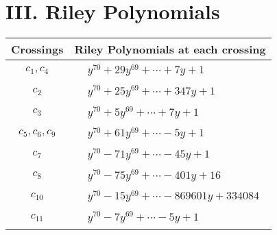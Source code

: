 \documentclass[1p]{elsarticle_modified}
\theoremstyle{definition}
\begin{document}
\centering \section*{ III. Riley Polynomials}
\begin{tabular}{m{50pt}|m{274pt}}
Crossings & \hspace{64pt}Riley Polynomials at each crossing \\
\hline $$\begin{aligned}c_{1},c_{4}\end{aligned}$$&$\begin{aligned}
&y^{70}+29 y^{69}+\cdots+7 y+1
\end{aligned}$\\
\hline $$\begin{aligned}c_{2}\end{aligned}$$&$\begin{aligned}
&y^{70}+25 y^{69}+\cdots+347 y+1
\end{aligned}$\\
\hline $$\begin{aligned}c_{3}\end{aligned}$$&$\begin{aligned}
&y^{70}+5 y^{69}+\cdots+7 y+1
\end{aligned}$\\
\hline $$\begin{aligned}c_{5},c_{6},c_{9}\end{aligned}$$&$\begin{aligned}
&y^{70}+61 y^{69}+\cdots-5 y+1
\end{aligned}$\\
\hline $$\begin{aligned}c_{7}\end{aligned}$$&$\begin{aligned}
&y^{70}-71 y^{69}+\cdots-45 y+1
\end{aligned}$\\
\hline $$\begin{aligned}c_{8}\end{aligned}$$&$\begin{aligned}
&y^{70}-75 y^{69}+\cdots-401 y+16
\end{aligned}$\\
\hline $$\begin{aligned}c_{10}\end{aligned}$$&$\begin{aligned}
&y^{70}-15 y^{69}+\cdots-869601 y+334084
\end{aligned}$\\
\hline $$\begin{aligned}c_{11}\end{aligned}$$&$\begin{aligned}
&y^{70}-7 y^{69}+\cdots-5 y+1
\end{aligned}$\\
\hline
\end{tabular}
\vskip 2pc
\end{document}
